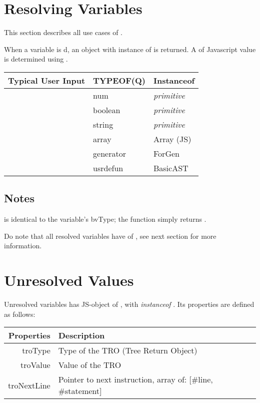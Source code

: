 \section{Resolving Variables}

This section describes all use cases of .

When a variable is d, an object with instance of  is returned. A  of Javascript value is determined using .

\begin{tabulary}{\textwidth}{RLL}
Typical User Input & TYPEOF(\textbf{Q}) & Instanceof \\
\hline
{} & {\ttfamily num} & \emph{primitive} \\
 & {\ttfamily boolean} & \emph{primitive} \\
 & {\ttfamily string} & \emph{primitive} \\
 & {\ttfamily array} & Array (JS) \\
 & {\ttfamily generator} & ForGen \\
 & {\ttfamily usrdefun} & BasicAST \\
\end{tabulary}

\subsection*{Notes}
\begin{itemlist}
\item {} is identical to the variable's bvType; the function simply returns .
\item Do note that all resolved variables have  of , see next section for more information.
\end{itemlist}

\section{Unresolved Values}

Unresolved variables has JS-object of , with \emph{instanceof} . Its properties are defined as follows:

\begin{tabulary}{\textwidth}{RL}
Properties & Description \\
\hline
{\ttfamily troType} & Type of the TRO (Tree Return Object) \\
{\ttfamily troValue} & Value of the TRO \\
{\ttfamily troNextLine} & Pointer to next instruction, array of: [\#line, \#statement] \\
\end{tabulary}

